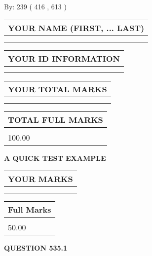 \documentclass[12pt]{article}
\begin{document}
   
\hspace{1.0in} By: 
 239 ( 416 ,  613 )
   
   
   
   
\newpage 
\setcounter{page}{ 
   535001 } 
   
   
   
   
\noindent\begin{tabular}{|l|}
\hline
YOUR NAME (FIRST, ... LAST)  \\
\hline
 \\ 
 \\ 
\hline
\end{tabular}
\hspace{0.05in} \begin{tabular}{|l|}
\hline
 YOUR   ID   INFORMATION  \\
\hline
 \\ 
 \\ 
\hline
\end{tabular}
   
   
\vspace{0.2in}\noindent\begin{tabular}{|l|}
\hline
YOUR TOTAL MARKS  \\
\hline
 \\ 
 \\ 
\hline
\end{tabular}
\hspace{0.05in} \begin{tabular}{|l|}
\hline
TOTAL FULL MARKS  \\
\hline
 \\ 
100.00 \\
\hline
\end{tabular}
   
   
 \vspace{0.2in}
{\LARGE {\textbf{ A QUICK TEST EXAMPLE}}}
   
   
  
\vspace{0.2in}
  
\noindent\begin{tabular}{|l|}
\hline
 YOUR MARKS  \\
\hline
 \\ 
 \\ 
\hline
\end{tabular}
\hspace{0.05in} \begin{tabular}{|l|}
\hline
 Full Marks  \\
\hline
 \\ 
50.00 \\
\hline
\end{tabular}
{\textbf{\Large{QUESTION
535.1 
}}}
  
\end{document}
